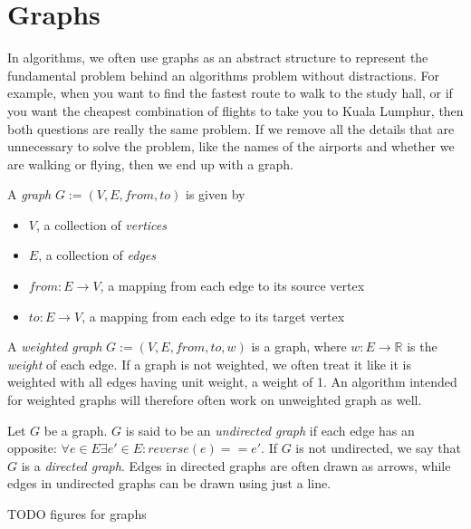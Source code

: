 \section{Graphs}
In algorithms, we often use graphs as an abstract structure to represent the fundamental problem behind an algorithms problem without distractions. For example, when you want to find the fastest route to walk to the study hall, or if you want the cheapest combination of flights to take you to Kuala Lumphur, then both questions are really the same problem. If we remove all the details that are unnecessary to solve the problem, like the names of the airports and whether we are walking or flying, then we end up with a graph.

\begin{definition}[Graph]
    A \emph{graph} $G := (V, E, from, to)$ is given by
\begin{itemize}
    \item $V$, a collection of \emph{vertices}
    \item $E$, a collection of \emph{edges}
    \item $from : E \rightarrow V$, a mapping from each edge to its source vertex
    \item $to : E \rightarrow V$, a mapping from each edge to its target vertex 
\end{itemize}
\end{definition}

\begin{definition}
    A \emph{weighted graph} $G := (V, E, from, to, w)$ is a graph, where $w : E \rightarrow \mathbb{R}$ is the \emph{weight} of each edge. If a graph is not weighted, we often treat it like it is weighted with all edges having unit weight, a weight of 1. An algorithm intended for weighted graphs will therefore often work on unweighted graph as well.
\end{definition}

\begin{definition}
    Let $G$ be a graph. $G$ is said to be an \emph{undirected graph} if each edge has an opposite: $\forall e \in E \exists e' \in E : reverse(e) == e'$.
    If $G$ is not undirected, we say that $G$ is a \emph{directed graph}.
    Edges in directed graphs are often drawn as arrows, while edges in undirected graphs can be drawn using just a line.

    TODO figures for graphs
\end{definition}

